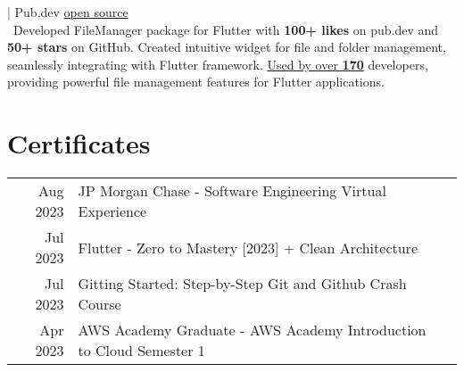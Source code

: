 \documentclass[]{resume}
\begin{document}
\begin{minipage}[t]{0.66\textwidth}
    | Pub.dev
    \hfill\href{https://github.com/DevsOnFlutter/file_manager}{open source}
    \\\
    \hspace{1cm}\fontsize{10}{12}\selectfont Developed FileManager package for Flutter with \textbf{100+ likes} on pub.dev and \textbf{50+ stars} on GitHub. Created intuitive widget for file and folder management, seamlessly integrating with Flutter framework. \href{https://github.com/DevsOnFlutter/file_manager/network/dependents}{Used by over \textbf{170}} developers, providing powerful file management features for Flutter applications.
    \sectionsep


    \section{Certificates}
    \begin{tabular}{rll}
        Aug 2023 & JP Morgan Chase - Software Engineering Virtual Experience           \\
        Jul 2023 & Flutter - Zero to Mastery [2023] + Clean Architecture               \\
        Jul 2023 & Gitting Started: Step-by-Step Git and Github Crash Course           \\
        Apr 2023 & AWS Academy Graduate - AWS Academy Introduction to Cloud Semester 1
    \end{tabular}
    \sectionsep

\end{minipage}
\end{document}
